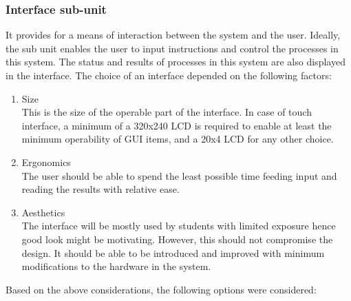 \subsubsection{Interface sub-unit}
It provides for a means of interaction between the system and the user. Ideally, the sub unit enables the user to input instructions and control the processes in this system. The status and results of processes in this system are also displayed in the interface. The choice of an interface depended on the following factors:
\begin{enumerate}
    \item Size \\
    This is the size of the operable part of the interface. In case of touch interface, a minimum of a 320x240 LCD is required to enable at least the minimum operability of GUI items, and a 20x4 LCD for any other choice.
    \item Ergonomics \\
    The user should be able to spend the least possible time feeding input and reading the results with relative ease. 
    \item Aesthetics \\
      The interface will be mostly used by students with limited exposure hence good look might be motivating. However, this should not compromise the design. It should be able to be introduced and improved with minimum modifications to the hardware in the system. 
\end{enumerate}
Based on the above considerations, the following options were considered:

